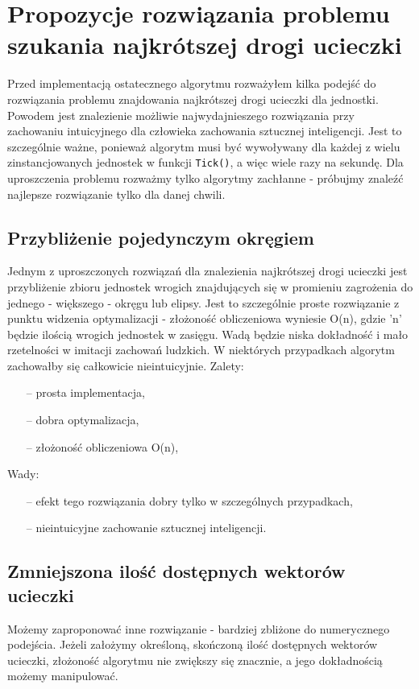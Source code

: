 \documentclass[12pt]{report}
\begin{document}
\section{Propozycje rozwiązania problemu szukania najkrótszej drogi ucieczki}

Przed implementacją ostatecznego algorytmu rozważyłem kilka podejść do rozwiązania problemu znajdowania najkrótszej drogi ucieczki dla jednostki. Powodem jest znalezienie możliwie najwydajnieszego rozwiązania przy zachowaniu intuicyjnego dla człowieka zachowania sztucznej inteligencji. Jest to szczególnie ważne, ponieważ algorytm musi być wywoływany dla każdej z wielu zinstancjowanych jednostek w funkcji \texttt{\texttt{Tick}()}, a więc wiele razy na sekundę. Dla uproszczenia problemu rozważmy tylko algorytmy zachłanne - próbujmy znaleźć najlepsze rozwiązanie tylko dla danej chwili.

\subsection{Przybliżenie pojedynczym okręgiem}
Jednym z uproszczonych rozwiązań dla znalezienia najkrótszej drogi ucieczki jest przybliżenie zbioru jednostek wrogich znajdujących się w promieniu zagrożenia do jednego - większego - okręgu lub elipsy. Jest to szczególnie proste rozwiązanie z punktu widzenia optymalizacji - złożoność obliczeniowa wyniesie O(n), gdzie 'n' będzie ilością wrogich jednostek w zasięgu. Wadą będzie niska dokładność i mało rzetelności w imitacji zachowań ludzkich. W niektórych przypadkach algorytm zachowałby się całkowicie nieintuicyjnie.
Zalety:
\begin{itemize}
\item[--] prosta implementacja,
\item[--] dobra optymalizacja,
\item[--] złożoność obliczeniowa O(n),
\end{itemize}
Wady:
\begin{itemize}
\item[--] efekt tego rozwiązania dobry tylko w szczególnych przypadkach,
\item[--] nieintuicyjne zachowanie sztucznej inteligencji.
\end{itemize}

\subsection{Zmniejszona ilość dostępnych wektorów ucieczki}
Możemy zaproponować inne rozwiązanie - bardziej zbliżone do numerycznego podejścia. Jeżeli założymy określoną, skończoną ilość dostępnych wektorów ucieczki, złożoność algorytmu nie zwiększy się znacznie, a jego dokładnością możemy manipulować. 
\end{document}
